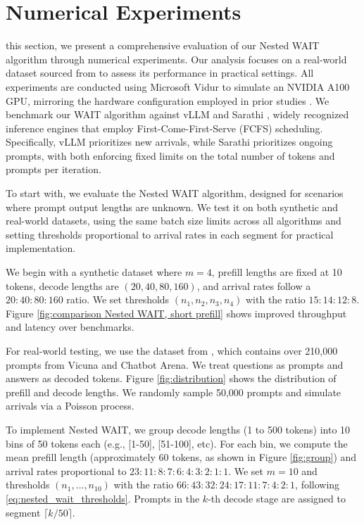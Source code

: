 \section{Numerical Experiments}
\label{sec:experiments}

\In this section, we present a comprehensive evaluation of our Nested WAIT algorithm through numerical experiments. Our analysis focuses on a real-world dataset sourced from \cite{zheng2023lmsys} to assess its performance in practical settings. All experiments are conducted using Microsoft Vidur to simulate an NVIDIA A100 GPU, mirroring the hardware configuration employed in prior studies \citep{agrawal2024vidur}. We benchmark our WAIT algorithm against vLLM \citep{kwon2023efficient} and Sarathi \citep{agrawal2023sarathi}, widely recognized inference engines that employ First-Come-First-Serve (FCFS) scheduling. Specifically, vLLM prioritizes new arrivals, while Sarathi prioritizes ongoing prompts, with both enforcing fixed limits on the total number of tokens and prompts per iteration.

To start with, we evaluate the Nested WAIT algorithm, designed for scenarios where prompt output lengths are unknown. We test it on both synthetic and real-world datasets, using the same batch size limits across all algorithms and setting thresholds proportional to arrival rates in each segment for practical implementation.

We begin with a synthetic dataset where \( m=4 \), prefill lengths are fixed at 10 tokens, decode lengths are \( (20, 40, 80, 160) \), and arrival rates follow a \( 20:40:80:160 \) ratio. We set thresholds \( (n_1, n_2, n_3, n_4) \) with the ratio \( 15:14:12:8 \). Figure \ref{fig:comparison Nested WAIT, short prefill} shows improved throughput and latency over benchmarks.

For real-world testing, we use the dataset from \cite{zheng2023lmsys}, which contains over 210,000 prompts from Vicuna and Chatbot Arena. We treat questions as prompts and answers as decoded tokens. Figure \ref{fig:distribution} shows the distribution of prefill and decode lengths. We randomly sample 50,000 prompts and simulate arrivals via a Poisson process.

To implement Nested WAIT, we group decode lengths (1 to 500 tokens) into 10 bins of 50 tokens each (e.g., [1-50], [51-100], etc). For each bin, we compute the mean prefill length (approximately 60 tokens, as shown in Figure \ref{fig:group}) and arrival rates proportional to \( 23:11:8:7:6:4:3:2:1:1 \). We set \( m=10 \) and thresholds \( (n_1, \dots, n_{10}) \) with the ratio \( 66:43:32:24:17:11:7:4:2:1 \), following \eqref{eq:nested_wait_thresholds}. Prompts in the \( k \)-th decode stage are assigned to segment \( \lceil k/50 \rceil \).

